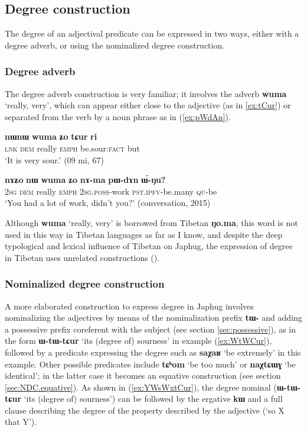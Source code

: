 \documentclass[oneside,a4paper,11pt]{article}
\newcommand{\ipa}[1]{{\phon\textbf{#1}}}
\newcommand{\forme}[2]{\ipa{#1} `#2'}
\begin{document}
\subsection{Degree construction}
The degree of an adjectival predicate can be expressed in two ways, either with a degree adverb, or using the nominalized degree construction.

\subsubsection{Degree adverb} \label{sec:wuma}
The degree adverb construction is very familiar; it involves the adverb \forme{wuma}{really, very}, which can appear either close to the adjective (as in \ref{ex:tCur}) or separated from the verb by a noun phrase as in (\ref{ex:pWdAn}).

\begin{exe}
\ex \label{ex:tCur}
\gll \ipa{tɕe} 	\ipa{nɯnɯ} 	\ipa{wuma} 	\ipa{ʑo} 	\ipa{tɕur} 	\ipa{ri} \\
\textsc{lnk} \textsc{dem} really  \textsc{emph} be.sour:\textsc{fact} but \\
\glt `It is very sour.' (09 mi, 67)
\end{exe}

\begin{exe}
\ex \label{ex:pWdAn}
\gll
\ipa{nɤʑo} 	\ipa{nɯ} 	\ipa{wuma} 	\ipa{ʑo} 	\ipa{nɤ-ma} 	\ipa{pɯ-dɤn} 	\ipa{ɯ́-ŋu?}  \\
\textsc{2sg} \textsc{dem} really \textsc{emph} \textsc{2sg.poss}-work \textsc{pst.ipfv}-be.many \textsc{qu}-be \\
\glt `You had a lot of work, didn't you?' (conversation, 2015)
\end{exe}

Although \forme{wuma}{really, very} is borrowed from Tibetan \ipa{ŋo.ma}, this word is not used in this way in Tibetan languages as far as I know, and despite the deep typological and lexical influence of Tibetan on Japhug, the expression of degree in Tibetan uses unrelated constructions (\citealt{simon15evaluative}).

\subsubsection{Nominalized degree construction} \label{sec:NDC}
A more elaborated construction to express degree in Japhug involves nominalizing the adjectives by means of the nominalization prefix \ipa{tɯ-} and adding a possessive prefix coreferent with the subject (see section \ref{sec:possessive}), as in the form \forme{ɯ-tɯ-tɕur}{its (degree of) sourness} in example (\ref{ex:WtWCur}), followed by a predicate expressing the degree such as  \forme{saχaʁ}{be extremely} in this example. Other possible predicates include \forme{tɕʰom}{be too much} or \forme{naχtɕɯɣ}{be identical}; in the latter case it becomes an equative construction (see section \ref{sec:NDC.equative}).  As shown in (\ref{ex:YWsWxtCur}), the degree nominal (\ipa{ɯ-tɯ-tɕur} `its (degree of) sourness') can be followed by the ergative \ipa{kɯ} and a full clause describing the degree of the property described by the adjective (`so X that Y').
\end{document}
